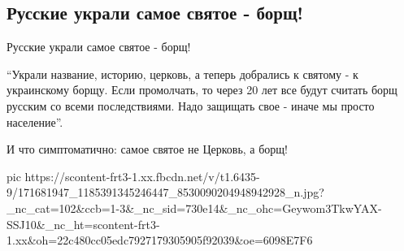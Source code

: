  
 
 
 
 
\subsection{Русские украли самое святое - борщ!}

Русские украли самое святое - борщ! 

\enquote{Украли название, историю, церковь, а теперь добрались к святому - к
украинскому борщу. Если промолчать, то через 20 лет все будут считать борщ
русским со всеми последствиями.  Надо защищать свое - иначе мы просто
население}.

И что симптоматично: самое святое не Церковь, а борщ!


\ifcmt
  pic https://scontent-frt3-1.xx.fbcdn.net/v/t1.6435-9/171681947_1185391345246447_8530090204948942928_n.jpg?_nc_cat=102&ccb=1-3&_nc_sid=730e14&_nc_ohc=Geywom3TkwYAX-SSJ10&_nc_ht=scontent-frt3-1.xx&oh=22c480cc05edc7927179305905f92039&oe=6098E7F6
\fi


